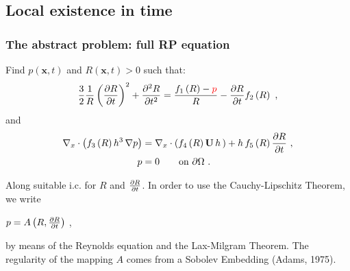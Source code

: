 \documentclass[10pt,aspectratio=169]{beamer}
\begin{document}
\subsection{Local existence in time}
\setcounter{showSlideNumbers}{0}
\begin{frame}[noframenumbering]
\tableofcontents[
currentsection,
currentsubsection,
subsectionstyle=show/shaded/hide
]
\end{frame}
\setcounter{showSlideNumbers}{1}


\begin{frame}
\frametitle{The abstract problem: full RP equation}\vspace*{0.5cm}
Find $p(\mathbf{x},t)$ and $R(\mathbf{x},t)>0$ such that:
\begin{equation*}
\frac{3}{2}\frac{1}{R}\left(\frac{\partial R}{\partial t}\right)^2+\frac{\partial^2 R}{\partial t^2}=\frac{f_1\left(R\right)-{\color{red}p}}{R}-\frac{\partial R}{\partial t}f_2\left(R\right)~,
\end{equation*}
and
\begin{align*}
\begin{split}
\nabla_x\cdot \left(f_3\left(R\right) h^3\,\nabla p\right)&=\nabla_x\cdot \left(f_4\left(R\right)\mathbf{U}\,h\,\right)+h\,f_5\left(R\right)\frac{\partial R}{\partial t}~,\\
p&=0 \qquad\mbox{on } \partial \Omega~.
\end{split}
\end{align*}

Along suitable i.c. for $R$ and $\frac{\partial R}{\partial t}$. In order to use the Cauchy-Lipschitz Theorem, we write
\begin{center}
 {\color{red}$p=A\left(R,\frac{\partial R}{\partial t}\right)$} ,
\end{center}
by means of the Reynolds equation and the Lax-Milgram Theorem. The regularity of the mapping $A$ comes from a Sobolev Embedding (Adams, 1975).
\end{frame} 

\end{document}
